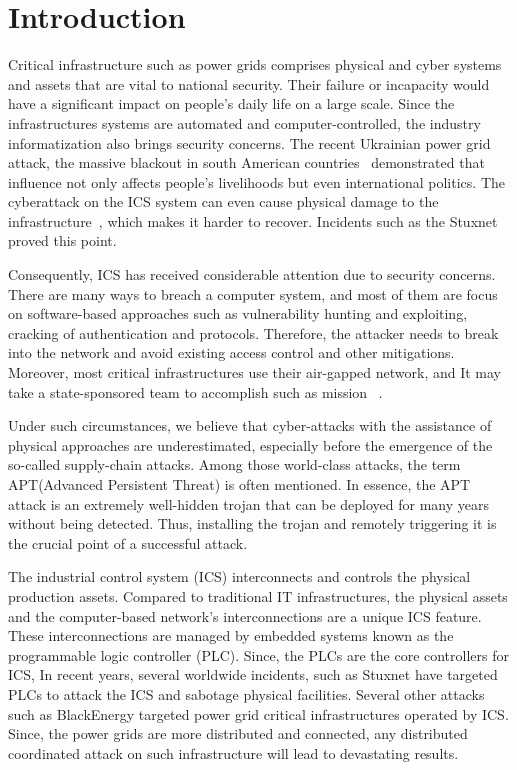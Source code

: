 \section{Introduction}
\label{sec:implant-introduction}

Critical infrastructure such as power grids comprises physical and cyber systems and assets that are vital to national security. Their failure or incapacity would have a significant impact on people's daily life on a large scale. Since the infrastructures systems are automated and computer-controlled, the industry informatization also brings security concerns. The recent Ukrainian power grid attack, the massive blackout in south American countries~\cite{haes2019survey} demonstrated that influence not only affects people's livelihoods but even international politics. The cyberattack on the ICS system can even cause physical damage to the infrastructure~\cite{zeller2011myth}, which makes it harder to recover. Incidents such as the Stuxnet proved this point. 

Consequently, ICS has received considerable attention due to security concerns. There are many ways to breach a computer system, and most of them are focus on software-based approaches such as vulnerability hunting and exploiting, cracking of authentication and protocols. Therefore, the attacker needs to break into the network and avoid existing access control and other mitigations. Moreover, most critical infrastructures use their air-gapped network, and It may take a state-sponsored team to accomplish such as mission ~\cite{langner2011stuxnet}. 

Under such circumstances, we believe that cyber-attacks with the assistance of physical approaches are underestimated, especially before the emergence of the so-called supply-chain attacks. Among those world-class attacks, the term APT(Advanced Persistent Threat) is often mentioned. In essence, the APT attack is an extremely well-hidden trojan that can be deployed for many years without being detected. Thus, installing the trojan and remotely triggering it is the crucial point of a successful attack.

The industrial control system (ICS) interconnects and controls the physical production assets. Compared to traditional IT infrastructures, the physical assets and the computer-based network's interconnections are a unique ICS feature. These interconnections are managed by embedded systems known as the programmable logic controller (PLC). Since, the PLCs are the core controllers for ICS, In recent years, several worldwide incidents, such as Stuxnet \cite{langner2011stuxnet} have targeted PLCs to attack the ICS and sabotage physical facilities. Several other attacks such as BlackEnergy \cite{cherepanov2016blackenergy, case2016analysis, soltan2016power, zhang2013time, williams2016power} targeted power grid critical infrastructures operated by ICS. Since, the power grids are more distributed and connected, any distributed coordinated attack on such infrastructure will lead to devastating results.

